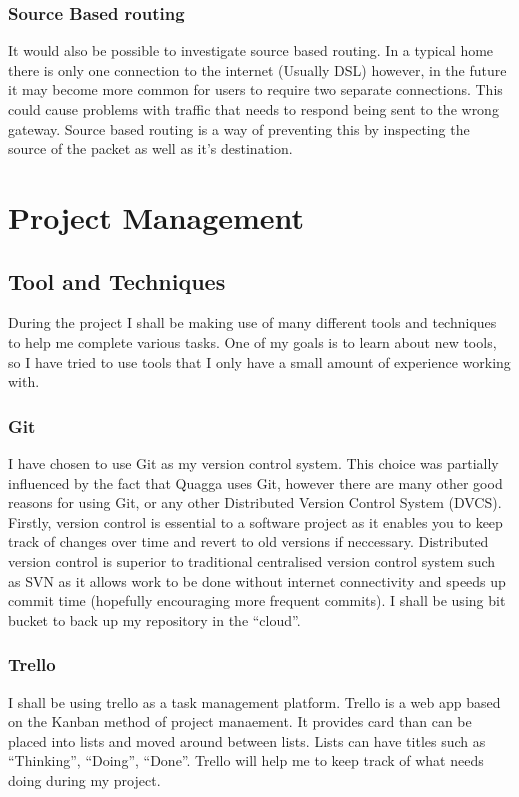 \documentclass[12pt]{report}
\begin{document}
\subsection{Source Based routing}
It would also be possible to investigate source based routing. In a typical home
there is only one connection to the internet (Usually DSL) however, in the
future it may become more common for users to require two separate connections.
This could cause problems with traffic that needs to respond being sent to the
wrong gateway. Source based routing is a way of preventing this by inspecting
the source of the packet as well as it's destination.

\chapter{Project Management}

\section{Tool and Techniques}

During the project I shall be making use of many different tools and techniques
to help me complete various tasks. One of my goals is to learn about new tools,
so I have tried to use tools that I only have a small amount of experience
working with. 

\subsection{Git}
I have chosen to use Git as my version control system. This choice was
partially influenced by the fact that Quagga uses Git, however there are many
other good reasons for using Git, or any other Distributed Version Control
System (DVCS). Firstly, version control is essential to a software project as
it enables you to keep track of changes over time and revert to old versions if
neccessary. Distributed version control is superior to traditional centralised 
version control system such as SVN as it allows work to be done without internet
connectivity and speeds up commit time (hopefully encouraging more frequent
commits). I shall be using bit bucket to back up my repository in the ``cloud''.

\subsection{Trello}
I shall be using trello as a task management platform. Trello is a web app based 
on the Kanban method of project manaement. It provides card than can be placed
into lists and moved around between lists. Lists can have titles such as
``Thinking'', ``Doing'', ``Done''. Trello will help me to keep track of what
needs doing during my project.
\end{document}
